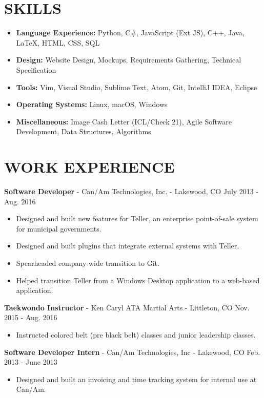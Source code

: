\documentclass[10.5pt,letterpaper]{article}
\begin{document}
\section*{SKILLS}
{\renewcommand\labelitemi{}
    \renewcommand\leftmargini{0pt}
    \begin{itemize}
        \item \textbf{Language Experience:} Python, C\#, JavaScript (Ext JS), C++,
            Java, \LaTeX, HTML, CSS, SQL
        \item \textbf{Design:} Website Design, Mockups, Requirements Gathering,
            Technical Specification
        \item \textbf{Tools:} Vim, Visual Studio, Sublime Text, Atom, Git,
            IntelliJ IDEA, Eclipse
        \item \textbf{Operating Systems:} Linux, macOS, Windows
        \item \textbf{Miscellaneous:} Image Cash Letter (ICL/Check 21), Agile
            Software Development, Data Structures, Algorithms
    \end{itemize}
}

\section*{WORK EXPERIENCE}
\textbf{Software Developer} - Can/Am Technologies, Inc. - Lakewood, CO
\hfill July 2013 - Aug. 2016
\begin{itemize}
    \item Designed and built new features for Teller, an enterprise
        point-of-sale system for municipal governments.
    \item Designed and built plugins that integrate external systems with
        Teller.
    \item Spearheaded company-wide transition to Git.
    \item Helped transition Teller from a Windows Desktop application to a
        web-based application.
\end{itemize}

\vspace{4pt}
\textbf{Taekwondo Instructor} - Ken Caryl ATA Martial Arts - Littleton, CO
\hfill Nov. 2015 - Aug. 2016
\begin{itemize}
    \item Instructed colored belt (pre black belt) classes and junior leadership
        classes.
\end{itemize}

\vspace{4pt}
\textbf{Software Developer Intern} - Can/Am Technologies, Inc - Lakewood, CO
\hfill Feb. 2013 - June 2013
\begin{itemize}
    \item Designed and built an invoicing and time tracking system for internal
        use at Can/Am.
\end{itemize}
\end{document}

